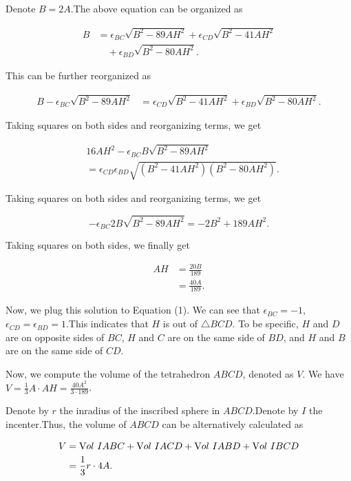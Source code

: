 \begin{enumerate}
 Denote $B = 2A$.The above equation can be organized as

 \begin{align*}B & = \epsilon_{BC} \sqrt{B^2 - 89 AH^2}+ \epsilon_{CD} \sqrt{B^2 - 41 AH^2} \\& \quad + \epsilon_{BD} \sqrt{B^2 - 80 AH^2} .\end{align*}


 This can be further reorganized as

 \begin{align*}B - \epsilon_{BC} \sqrt{B^2 - 89 AH^2}& = \epsilon_{CD} \sqrt{B^2 - 41 AH^2}+ \epsilon_{BD} \sqrt{B^2 - 80 AH^2} .\end{align*}


 Taking squares on both sides and reorganizing terms, we get

 \begin{align*}& 16 AH^2 - \epsilon_{BC} B \sqrt{B^2 - 89 AH^2} \\& = \epsilon_{CD} \epsilon_{BD}\sqrt{\left( B^2 - 41 AH^2 \right) \left( B^2 - 80 AH^2 \right)} .\end{align*}


 Taking squares on both sides and reorganizing terms, we get

 
 \[ - \epsilon_{BC} 2 B \sqrt{B^2 - 89 AH^2} = - 2 B^2 + 189 AH^2 . \]

 Taking squares on both sides, we finally get

 \begin{align*}AH & = \frac{20B}{189} \\& = \frac{40A}{189}.\end{align*}


 Now, we plug this solution to Equation (1). We can see that $\epsilon_{BC} = -1$, $\epsilon_{CD} = \epsilon_{BD} = 1$.This indicates that $H$ is out of $\triangle BCD$. To be specific, $H$ and $D$ are on opposite sides of $BC$, $H$ and $C$ are on the same side of $BD$, and $H$ and $B$ are on the same side of $CD$. 

 Now, we compute the volume of the tetrahedron $ABCD$, denoted as $V$. We have $V = \frac{1}{3} A \cdot AH = \frac{40 A^2}{3 \cdot 189}$.

 Denote by $r$ the inradius of the inscribed sphere in $ABCD$.Denote by $I$ the incenter.Thus, the volume of $ABCD$ can be alternatively calculated as

 \begin{align*}V & = {\textrm Vol} \ IABC + {\textrm Vol} \ IACD + {\textrm Vol} \ IABD + {\textrm Vol} \ IBCD \\& = \frac{1}{3} r \cdot 4A .\end{align*}



\end{enumerate}

